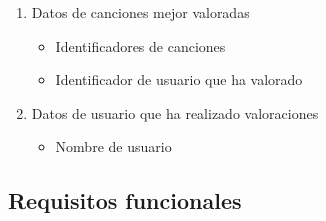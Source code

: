 \documentclass[12pt,a4paper]{article}
\begin{document}
\begin{enumerate}[label=\textnormal{RD\arabic*.}]
\begin{itemize}
		\end{itemize}
	\item Datos de canciones mejor valoradas  \label{rd32}
		\begin{itemize}
			\item Identificadores de canciones
			\item Identificador de usuario que ha valorado
		\end{itemize}
	\item Datos de usuario que ha realizado valoraciones  \label{rd33}
		\begin{itemize}
			\item Nombre de usuario
		\end{itemize}


\end{enumerate}


\subsection{Requisitos funcionales}
\end{document}
